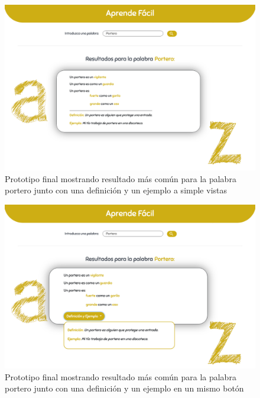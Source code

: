 	 	\begin{figure}[!t]
	 	\includegraphics[width=.8\textwidth]{Imagenes/Bitmap/Mockups/mockup2_irene_final_v2.png}
	 	\centering
	 	\caption{Prototipo final mostrando resultado más común para la palabra portero junto con una definición y un ejemplo a simple vistas}
	 	\label{fig:mockup2irene_v2_vFinal}
	 \end{figure}
 
 	\begin{figure}[!t]
 	\includegraphics[width=.8\textwidth]{Imagenes/Bitmap/Mockups/mockup2_irene_final_v3.png}
 	\centering
 	\caption{Prototipo final mostrando resultado más común para la palabra portero junto con una definición y un ejemplo en un mismo botón}
 	\label{fig:mockup2irene_v3_vFinal}
 \end{figure}

